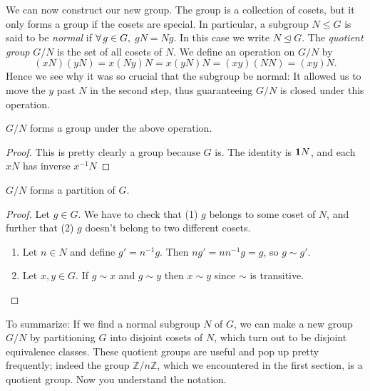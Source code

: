 We can now construct our new group. The group is a collection of cosets, but
it only forms a group if the cosets are special. In particular,
a subgroup $N\le G$ is said to be {\it normal} if 
$\operatorname{\forall} g\in G,$ $gN=Ng$. In this case we write $N\unlhd G$. The 
{\it quotient group} $G/N$ is the set of all cosets of 
$N$. We define an operation on $G/N$ by
\begin{equation}
  (xN)(yN)=x(Ny)N=x(yN)N=(xy)(NN)=(xy)N.
\end{equation}
Hence we see why it was so crucial that the subgroup be normal: It allowed
us to move the $y$ past $N$ in the second step, thus guaranteeing $G/N$ is
closed under this operation.
\begin{proposition}{}{}
  $G/N$ forms a group under the above operation.
  \begin{proof}
    This is pretty clearly a group because $G$ is. The identity is ${\mathbf 1} N$,
    and each $xN$ has inverse $x^{-1}N$
  \end{proof}
\end{proposition}
\begin{proposition}{}{}
  $G/N$ forms a partition of $G$.
  \begin{proof}
    Let $g\in G$. We have to check that (1) $g$ belongs to some coset of $N$,
    and further that (2) $g$ doesn't belong to two different cosets.
    \begin{enumerate}
      \item Let $n\in N$ and define $g'=n^{-1}g$. Then
            $ng'=nn^{-1}g=g$, so $g\sim g'$.
      \item Let $x,y\in G$. If $g\sim x$ and $g\sim y$ then $x\sim y$ since
            $\sim$ is transitive. 
    \end{enumerate}
  \end{proof}
\end{proposition}
To summarize: If we find a normal subgroup $N$ of $G$, we can make a new group
$G/N$ by partitioning $G$ into disjoint cosets of $N$, which turn out to be
disjoint equivalence classes. These quotient groups are useful and pop up
pretty frequently; indeed the group $\mathbb{Z}/n\mathbb{Z}$, which we
encountered in the first section, is a quotient group. Now you understand the
notation.
